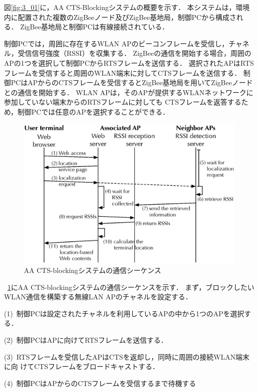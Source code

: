 \documentclass[technicalreport]{ieicej}
\begin{document}
図\ref{fig:3_01}に，AA CTS-Blockingシステムの概要を示す．
本システムは，環境内に配置された複数のZigBeeノード及びZigBee基地局，制御PCから構成される．
ZigBee基地局と制御PCは有線接続されている．

制御PCでは，周囲に存在するWLAN APのビーコンフレームを受信し，チャネル，受信信号強度（RSSI）を収集する．
ZigBeeの通信を開始する場合，周囲のAPの1つを選択して制御PCからRTSフレームを送信する．
選択されたAPはRTSフレームを受信すると周囲のWLAN端末に対してCTSフレームを送信する．
制御PCはAPからのCTSフレームを受信するとZigBee基地局を用いてZigBeeノードとの通信を開始する．
WLAN APは，そのAPが提供するWLANネットワークに参加していない端末からのRTSフレームに対しても
CTSフレームを返答するため，制御PCでは任意のAPを選択することができる．

\begin{figure}[bt]
 \centering
 \includegraphics[width=\columnwidth]{figure/sequence.eps}
 \caption{AA CTS-blockingシステムの通信シーケンス}
 \label{fig:sequence}
\end{figure}

\figurename~\ref{fig:sequence}にAA CTS-blockingシステムの通信シーケンスを示す．
まず，ブロックしたいWLAN通信を構築する無線LAN APのチャネルを設定する．

\noindent
(1)~制御PCは設定されたチャネルを利用しているAPの中から1つのAPを選択する．

\noindent
(2)~制御PCはAPに向けてRTSフレームを送信する．

\noindent
(3)~RTSフレームを受信したAPはCTSを返却し，同時に周囲の接続WLAN端末に向
けてCTSフレームをブロードキャストする．

\noindent
(4)~制御PCはAPからのCTSフレームを受信するまで待機する
\end{document}

